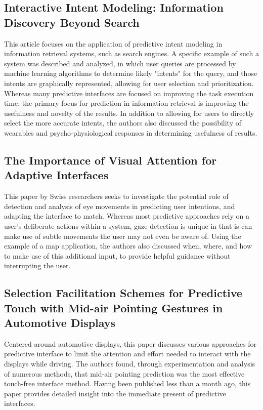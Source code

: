 \documentclass[format=acmsmall, nonacm, authorversion, screen]{acmart}
\begin{document}
\subsection{Interactive Intent Modeling: Information Discovery Beyond Search \citep{ruotsalo2014intent}}
This article focuses on the application of predictive intent modeling in information retrieval systems, such as search engines. A specific example of such a system was described and analyzed, in which user queries are processed by machine learning algorithms to determine likely "intents" for the query, and those intents are graphically represented, allowing for user selection and prioritization. Whereas many predictive interfaces are focused on improving the task execution time, the primary focus for prediction in information retrieval is improving the usefulness and novelty of the results. In addition to allowing for users to directly select the more accurate intents, the authors also discussed the possibility of wearables and psycho-physiological responses in determining usefulness of results.

\subsection{The Importance of Visual Attention for Adaptive Interfaces \citep{gobel2016importance}}
This paper by Swiss researchers seeks to investigate the potential role of detection and analysis of eye movements in predicting user intentions, and adapting the interface to match. Whereas most predictive approaches rely on a user's deliberate actions within a system, gaze detection is unique in that is can make use of subtle movements the user may not even be aware of. Using the example of a map application, the authors also discussed when, where, and how to make use of this additional input, to provide helpful guidance without interrupting the user. 

\subsection{Selection Facilitation Schemes for Predictive Touch with Mid-air Pointing Gestures in Automotive Displays \citep{ahmad2018selection}}
Centered around automotive displays, this paper discusses various approaches for predictive interface to limit the attention and effort needed to interact with the displays while driving. The authors found, through experimentation and analysis of numerous methods, that mid-air pointing prediction was the most effective touch-free interface method. Having been published less than a month ago, this paper provides detailed insight into the immediate present of predictive interfaces.
\end{document}
